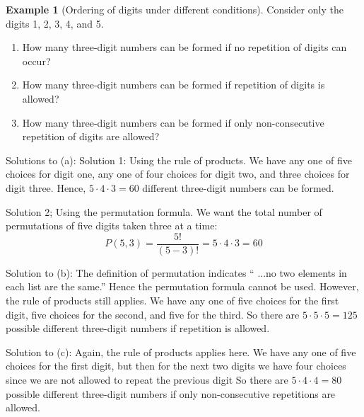 \documentclass[10pt,]{book}
\theoremstyle{plain}
\theoremstyle{definition}
\theoremstyle{definition}
\newtheorem{example}[theorem]{Example}
\theoremstyle{definition}
\begin{document}
\begin{example}[Ordering of digits under different conditions]\label{ordering-digits}
Consider only the digits 1, 2, 3, 4, and 5.%
\par
\leavevmode%
\begin{enumerate}[label=\alph*]
\item\hypertarget{li-20}{} How many three-digit numbers can be formed if no repetition of digits can occur?%
\item\hypertarget{li-21}{} How many three-digit numbers can be formed if repetition of digits is allowed?%
\item\hypertarget{li-22}{} How many three-digit numbers can be formed if only non-consecutive repetition of digits are allowed?%
\end{enumerate}
%
\par

 Solutions to (a): Solution 1: Using the rule of products. We have any one of five choices for digit one, any one of four choices for digit two, and three choices for digit three. Hence, \(5 \cdot 4 \cdot 3 = 60\) different three-digit numbers can be formed.
%
\par
Solution 2; Using the permutation formula. We want the total number of permutations of five digits taken three at a time:
 \begin{equation*}P(5,3)=\frac{5!}{(5-3)!}=5 \cdot 4 \cdot 3 = 60\end{equation*}%
\par
Solution to (b): The definition of permutation indicates `` ...no two elements in each list are the same.'' Hence the permutation formula cannot be used. However, the rule of products still applies. We have any one of five choices for the first digit, five choices for the second, and five for the third. So there are \(5 \cdot 5\cdot 5 = 125\) possible different three-digit numbers if repetition is allowed.%
\par
Solution to (c): Again, the rule of products applies here. We have any one of five choices for the first digit, but then for the next two digits we have four choices since we are not allowed to repeat the previous digit  So there are \(5 \cdot 4\cdot 4 = 80\) possible different three-digit numbers if only non-consecutive repetitions are allowed.%
\end{example}
\typeout{************************************************}
\typeout{************************************************}
\end{document}
